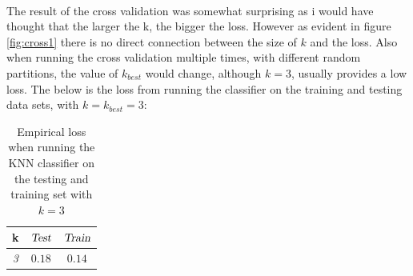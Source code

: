 \documentclass{article}
\begin{document}
\\ The result of the cross validation was somewhat surprising as i would have thought that the larger the k, the bigger the loss. However as evident in figure \ref{fig:cross1} there is no direct connection between the size of $k$ and the loss. Also when running the cross validation multiple times, with different random partitions, the value of $k_{best}$ would change, although $k=3$, usually provides a low loss. The below is the loss from running the classifier on the training and testing data sets, with $k = k_{best} = 3$:
\begin{table}[H]
  \centering
  \label{tab:table1}
  \begin{tabular}{c||c|c}
    \textsf{k} & $\textsl{Test}$ & $\textsl{Train}$\\
    \hline
    \textsl{3} & $0.18$ & $0.14$ \\
  \end{tabular}
  \caption{Empirical loss when running the KNN classifier on the testing and training set with $k=3$} 
\end{table}
\end{document}
